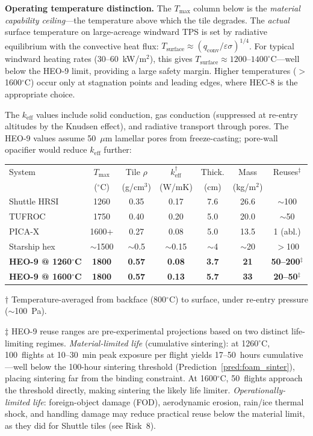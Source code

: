 \documentclass[12pt,letterpaper]{article}
\theoremstyle{definition}
\begin{document}
\textbf{Operating temperature distinction.}  The $T_{\max}$ column below is the \emph{material capability ceiling}---the temperature above which the tile degrades.  The \emph{actual} surface temperature on large-acreage windward TPS is set by radiative equilibrium with the convective heat flux: $T_{\mathrm{surface}} \approx (q_{\mathrm{conv}} / \varepsilon\sigma)^{1/4}$.  For typical windward heating rates (30--60~kW/m$^2$), this gives $T_{\mathrm{surface}} \approx 1200$--$1400^\circ$C---well below the HEO-9 limit, providing a large safety margin.  Higher temperatures ($>$1600$^\circ$C) occur only at stagnation points and leading edges, where HEC-8 is the appropriate choice.

The $k_{\mathrm{eff}}$ values include solid conduction, gas conduction (suppressed at re-entry altitudes by the Knudsen effect), and radiative transport through pores.  The HEO-9 values assume 50~$\mu$m lamellar pores from freeze-casting; pore-wall opacifier would reduce $k_{\mathrm{eff}}$ further:

\begin{center}
\small
\begin{tabular}{@{}lcccccc@{}}
\toprule
System & $T_{\max}$ & Tile $\rho$ & $k_{\mathrm{eff}}^{\dagger}$ & Thick. & Mass & Reuses$^{\ddagger}$ \\
 & ($^\circ$C) & (g/cm$^3$) & (W/mK) & (cm) & (kg/m$^2$) & \\
\midrule
Shuttle HRSI & 1260 & 0.35 & 0.17 & 7.6 & 26.6 & $\sim$100 \\
TUFROC & 1750 & 0.40 & 0.20 & 5.0 & 20.0 & $\sim$50 \\
PICA-X & 1600+ & 0.27 & 0.08 & 5.0 & 13.5 & 1 (abl.) \\
Starship hex & $\sim$1500 & $\sim$0.5 & $\sim$0.15 & $\sim$4 & $\sim$20 & $>$100 \\
\textbf{HEO-9 @ 1260$^\circ$C} & \textbf{1800} & \textbf{0.57} & \textbf{0.08} & \textbf{3.7} & \textbf{21} & \textbf{50--200$^{\ddagger}$} \\
\textbf{HEO-9 @ 1600$^\circ$C} & \textbf{1800} & \textbf{0.57} & \textbf{0.13} & \textbf{5.7} & \textbf{33} & \textbf{20--50$^{\ddagger}$} \\
\bottomrule
\end{tabular}
\normalsize
\end{center}
{\small $\dagger$ Temperature-averaged from backface (800$^\circ$C) to surface, under re-entry pressure ($\sim$100~Pa).}

{\small $\ddagger$ HEO-9 reuse ranges are pre-experimental projections based on two distinct life-limiting regimes.  \emph{Material-limited life} (cumulative sintering): at 1260$^\circ$C, 100~flights at 10--30~min peak exposure per flight yields 17--50~hours cumulative---well below the 100-hour sintering threshold (Prediction~\ref{pred:foam_sinter}), placing sintering far from the binding constraint.  At 1600$^\circ$C, 50~flights approach the threshold directly, making sintering the likely life limiter.  \emph{Operationally-limited life}: foreign-object damage (FOD), aerodynamic erosion, rain/ice thermal shock, and handling damage may reduce practical reuse below the material limit, as they did for Shuttle tiles (see Risk~8).}
\end{document}

